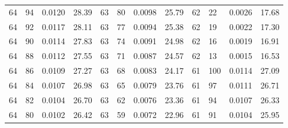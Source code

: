 \begin{tabular}{llll|llll|llll}
64 & 94 & 0.0120 & 28.39 & 63 & 80 & 0.0098 & 25.79 & 62 & 22 & 0.0026 & 17.68\\
64 & 92 & 0.0117 & 28.11 & 63 & 77 & 0.0094 & 25.38 & 62 & 19 & 0.0022 & 17.30\\
64 & 90 & 0.0114 & 27.83 & 63 & 74 & 0.0091 & 24.98 & 62 & 16 & 0.0019 & 16.91\\
64 & 88 & 0.0112 & 27.55 & 63 & 71 & 0.0087 & 24.57 & 62 & 13 & 0.0015 & 16.53\\
64 & 86 & 0.0109 & 27.27 & 63 & 68 & 0.0083 & 24.17 & 61 & 100 & 0.0114 & 27.09\\
64 & 84 & 0.0107 & 26.98 & 63 & 65 & 0.0079 & 23.76 & 61 & 97 & 0.0111 & 26.71\\
64 & 82 & 0.0104 & 26.70 & 63 & 62 & 0.0076 & 23.36 & 61 & 94 & 0.0107 & 26.33\\
64 & 80 & 0.0102 & 26.42 & 63 & 59 & 0.0072 & 22.96 & 61 & 91 & 0.0104 & 25.95\\
\bottomrule
\end{tabular}
\newpage
